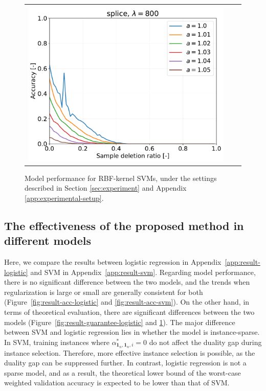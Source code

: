 \begin{figure}[H]
\begin{tabular}{ccc}
		\begin{minipage}[b]{0.3\hsize}\centering {\small Dataset: splice, $\lambda=n$}\\\includegraphics[width=0.8\hsize]{fig/splice/kernel_ss_screening_rate_lam800_x_n_y_etest.pdf}\end{minipage}
		\\
	
	\end{tabular}
	\caption{Model performance for RBF-kernel SVMs, under the settings described in Section \ref{sec:experiment} and Appendix \ref{app:experimental-setup}.}
	\label{fig:result-guarantee-svm}
	\end{figure}

	\newpage

\subsection{The effectiveness of the proposed method in different models} \label{app:model-disucussion}

Here, we compare the results between logistic regression in Appendix~\ref{app:result-logistic} and SVM in Appendix~\ref{app:result-svm}.
%
Regarding model performance, there is no significant difference between the two models, and the trends when regularization is large or small are generally consistent for both (Figure~\ref{fig:result-acc-logistic} and \ref{fig:result-acc-svm}).
%
On the other hand, in terms of theoretical evaluation, there are significant differences between the two models (Figure~\ref{fig:result-guarantee-logistic} and \ref{fig:result-guarantee-svm}).
%
The major difference between SVM and logistic regression lies in whether the model is instance-sparse.
%
In SVM, training instances where \(\alpha^*_{\bm 1_n, \bm 1_n, i} = 0\) do not affect the duality gap during instance selection.
%
Therefore, more effective instance selection is possible, as the duality gap can be suppressed further.
%
In contrast, logistic regression is not a sparse model, and as a result, the theoretical lower bound of the worst-case weighted validation accuracy is expected to be lower than that of SVM.

